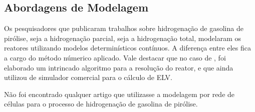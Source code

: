 \subsection{Abordagens de Modelagem} \label{sec:abordagensmodelagem}

Os pesquisadores que publicaram trabalhos sobre hidrogenação de gasolina
de pirólise, seja a hidrogenação parcial, seja a hidrogenação total, modelaram
os reatores utilizando modelos determinísticos contínuos. A diferença entre
eles fica a cargo do método númerico aplicado. Vale destacar que no caso de
, foi elaborado um intrincado algoritmo para a resolução
do reator, e que ainda utilizou de simulador comercial para o cálculo de ELV.

Não foi encontrado qualquer artigo que utilizasse a modelagem por rede de
células para o processo de hidrogenação de gasolina de pirólise.

